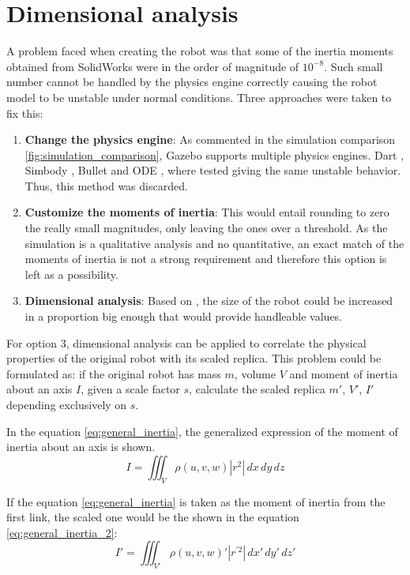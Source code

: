 \section{Dimensional analysis} %
\label{sec:dimensional_analysis}
A problem faced when creating the robot was that some of the inertia moments obtained from SolidWorks were in the order of magnitude of $10^{-8}$.
Such small number cannot be handled by the physics engine correctly causing the robot model to be unstable under normal conditions.
Three approaches were taken to fix this:

\begin{enumerate}
  \item \textbf{Change the physics engine}: As commented in the simulation comparison \ref{fig:simulation_comparison}, Gazebo supports multiple physics engines. Dart \cite{dart}, Simbody \cite{simbody}, Bullet \cite{bullet} and ODE \cite{ode}, where tested giving the same unstable behavior. 
  Thus, this method was discarded.
  \item \textbf{Customize the moments of inertia}: This would entail rounding to zero the really small magnitudes, only leaving the ones over a threshold.
  As the simulation is a qualitative analysis and no quantitative, an exact match of the moments of inertia is not a strong requirement and therefore this option is left as a possibility. 
  \item \textbf{Dimensional analysis}: Based on \cite{dimensional_analysis}, the size of the robot could be increased in a proportion big enough that would provide handleable values.
\end{enumerate}

For option $3$, dimensional analysis can be applied to correlate the physical properties of the original robot with its scaled replica.
This problem could be formulated as: if the original robot has mass $m$, volume $V$ and moment of inertia about an axis $I$, given a scale factor $s$, calculate the scaled replica $m'$, $V'$, $I'$ depending exclusively on $s$.

In the equation \ref{eq:general_inertia}, the generalized expression of the moment of inertia about an axis is shown.
\begin{equation}
\label{eq:general_inertia}
  I = \iiint_V \rho(u,v,w) |r^{2}| \,dx\,dy\,dz
\end{equation}

If the equation \ref{eq:general_inertia} is taken as the moment of inertia from the first link, the scaled one would be the shown in the equation \ref{eq:general_inertia_2}:
\begin{equation}
\label{eq:general_inertia_2}
  I' = \iiint_{V'} \rho(u,v,w)' |r^{'2}| \,dx'\,dy'\,dz'
\end{equation}

